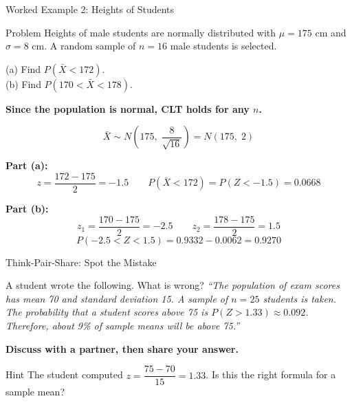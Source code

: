 \documentclass[aspectratio=169]{beamer}
\begin{document}
\begin{frame}{Worked Example 2: Heights of Students}
    \begin{exampleblock}{Problem}
        Heights of male students are normally distributed with $\mu = 175$ cm and
        $\sigma = 8$ cm.  A random sample of $n = 16$ male students is selected.

        \smallskip
        (a) Find $P(\bar{X} < 172)$.\\
        (b) Find $P(170 < \bar{X} < 178)$.
    \end{exampleblock}

    \textbf{Since the population is normal, CLT holds for any $n$.}

    \[
        \bar{X} \sim N\!\left(175,\; \frac{8}{\sqrt{16}}\right) = N(175,\; 2)
    \]

    \textbf{Part (a):}
    \[
        z = \frac{172 - 175}{2} = -1.5 \qquad
        P(\bar{X} < 172) = P(Z < -1.5) = \mathbf{0.0668}
    \]

    \textbf{Part (b):}
    \[
        z_1 = \frac{170-175}{2} = -2.5 \qquad z_2 = \frac{178-175}{2} = 1.5
    \]
    \[
        P(-2.5 < Z < 1.5) = 0.9332 - 0.0062 = \mathbf{0.9270}
    \]
\end{frame}

\begin{frame}{Think-Pair-Share: Spot the Mistake}
    \begin{alertblock}{A student wrote the following. What is wrong?}
        \textit{``The population of exam scores has mean 70 and standard deviation 15.
            A sample of $n = 25$ students is taken.
            The probability that a student scores above 75 is $P(Z > 1.33) \approx 0.092$.
            Therefore, about 9\% of sample means will be above 75.''}
    \end{alertblock}
    \bigskip
    \textbf{Discuss with a partner, then share your answer.}
    \bigskip
    \begin{block}{Hint}
        The student computed $z = \dfrac{75 - 70}{15} = 1.33$.
        Is this the right formula for a sample mean?
    \end{block}
\end{frame}
\end{document}
